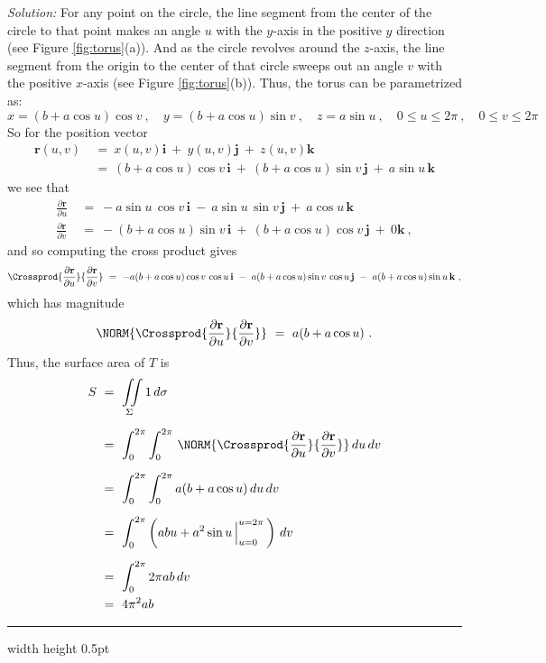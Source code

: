 \begin{exa}
\par\noindent \emph{Solution:}
For any point on the circle, the line segment from the center of the circle to that point makes an angle $u$ with the
$y$-axis in the positive $y$ direction (see Figure \ref{fig:torus}(a)). And as the circle revolves around the $z$-axis,
the line segment from the origin to the center of that circle sweeps out an angle $v$ with the positive $x$-axis (see
Figure \ref{fig:torus}(b)). Thus, the torus can be parametrized as:
\begin{displaymath}
 x = (b+a\cos u)\cos v ~,\quad y = (b+a\cos u)\sin v ~,\quad z = a\sin u~,\quad 0\le u\le 2\pi~,\quad 0\le v\le 2\pi
\end{displaymath}
So for the position vector
\begin{align*}
 \textbf{r}(u,v) ~&=~ x(u,v) \textbf{i} ~+~ y(u,v) \textbf{j} ~+~ z(u,v) \textbf{k}\\
 &=~ (b+a\cos u)\cos v \,\textbf{i} ~+~ (b+a\cos u)\sin v \,\textbf{j} ~+~ a\sin u \,\textbf{k}
\end{align*}
we see that
\begin{align*}
 \frac{\partial \textbf{r}}{\partial u} ~&=~
  -a\sin u\,\cos v \,\textbf{i} ~-~ a\sin u\,\sin v \,\textbf{j} ~+~ a\cos u \,\textbf{k}\\[6pt]
 \frac{\partial \textbf{r}}{\partial v} ~&=~
  -(b+a\cos u)\sin v \,\textbf{i} ~+~ (b+a\cos u)\cos v \,\textbf{j} ~+~ 0 \textbf{k} ~,
\end{align*}
and so computing the cross product gives
\begin{displaymath}
 \Crossprod{\frac{\partial \textbf{r}}{\partial u}}{\frac{\partial \textbf{r}}{\partial v}} ~=~
  -a(b+a\cos u)\cos v\,\cos u \,\textbf{i} ~-~ a(b+a\cos u)\sin v\,\cos u\,\textbf{j} ~-~ a(b+a\cos u)\sin u \,\textbf{k} ~,
\end{displaymath}
which has magnitude
\begin{displaymath}
 \NORM{\Crossprod{\frac{\partial \textbf{r}}{\partial u}}{\frac{\partial \textbf{r}}{\partial v}}} ~=~ a(b+a\cos u) ~.
\end{displaymath}
Thus, the surface area of $T$ is
\begin{align*}
 S ~&=~ \iint\limits_{\Sigma} 1\,d\sigma\\[6pt]
  &=~ \int_0^{2\pi} \int_0^{2\pi}\,\NORM{\Crossprod{\frac{\partial \textbf{r}}{\partial u}}{\frac{\partial
  \textbf{r}}{\partial v}}}\,du\,dv\\[6pt]
  &=~ \int_0^{2\pi} \int_0^{2\pi} a(b+a\cos u)\,du\,dv\\[6pt]
  &=~ \int_0^{2\pi} \left( abu + a^2 \sin u \,\Big|_{u=0}^{u=2\pi}\,\right)\,dv\\[6pt]
  &=~ \int_0^{2\pi} 2\pi ab\,dv\\
  &=~ 4\pi^2 ab
\end{align*}
\end{exa}
\hrule width \textwidth height 0.5pt
\vspace{3mm}

